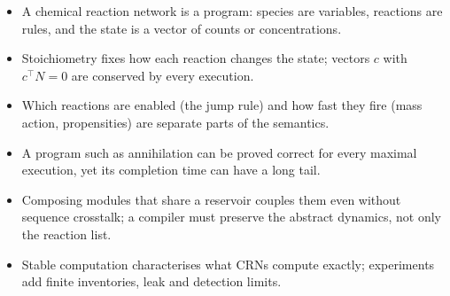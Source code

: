 \begin{KeyIdeas}
\begin{itemize}\setlength{\itemsep}{2pt}
\item A chemical reaction network is a program: species are variables, reactions
are rules, and the state is a vector of counts or concentrations.
\item Stoichiometry fixes how each reaction changes the state; vectors $c$ with
$c^\top N=0$ are conserved by every execution.
\item Which reactions are enabled (the jump rule) and how fast they fire (mass
action, propensities) are separate parts of the semantics.
\item A program such as annihilation can be proved correct for every maximal
execution, yet its completion time can have a long tail.
\item Composing modules that share a reservoir couples them even without
sequence crosstalk; a compiler must preserve the abstract dynamics, not only the
reaction list.
\item Stable computation characterises what CRNs compute exactly; experiments
add finite inventories, leak and detection limits.
\end{itemize}
\end{KeyIdeas}

